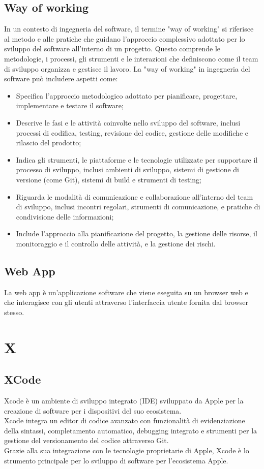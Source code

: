 \documentclass{article}
\begin{document}
\subsection{Way of working}
In un contesto di ingegneria del software, il termine "way of working" si riferisce al metodo e alle pratiche che guidano l'approccio complessivo adottato per lo sviluppo del software all'interno di un progetto. Questo comprende le metodologie, i processi, gli strumenti e le interazioni che definiscono come il team di sviluppo organizza e gestisce il lavoro. La "way of working" in ingegneria del software può includere aspetti come:
\begin{itemize}
    \item Specifica l'approccio metodologico adottato per pianificare, progettare, implementare e testare il software;
    \item Descrive le fasi e le attività coinvolte nello sviluppo del software, inclusi processi di codifica, testing, revisione del codice, gestione delle modifiche e rilascio del prodotto;
    \item Indica gli strumenti, le piattaforme e le tecnologie utilizzate per supportare il processo di sviluppo, inclusi ambienti di sviluppo, sistemi di gestione di versione (come Git), sistemi di build e strumenti di testing;
    \item Riguarda le modalità di comunicazione e collaborazione all'interno del team di sviluppo, inclusi incontri regolari, strumenti di comunicazione, e pratiche di condivisione delle informazioni;
    \item Include l'approccio alla pianificazione del progetto, la gestione delle risorse, il monitoraggio e il controllo delle attività, e la gestione dei rischi.
\end{itemize}

\subsection{Web App}
 La web app è un'applicazione software che viene eseguita su un browser web e che interagisce con gli utenti attraverso l'interfaccia utente fornita dal browser stesso.

\section{X}
 \subsection{XCode}
 Xcode è un ambiente di sviluppo integrato (IDE) sviluppato da Apple per la creazione di software per i dispositivi del suo ecosistema.\\
 Xcode integra un editor di codice avanzato con funzionalità di evidenziazione della sintassi, completamento automatico, debugging integrato e strumenti per la gestione del versionamento del codice attraverso Git.\\
 Grazie alla sua integrazione con le tecnologie proprietarie di Apple, Xcode è lo strumento principale per lo sviluppo di software per l'ecosistema Apple.
 
\end{document}
